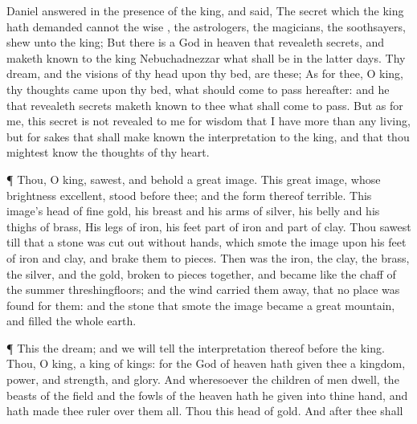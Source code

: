 {Daniel
answered in the
presence of the
king, and
said, The
secret which the
king hath
demanded
cannot the
wise
{}, the
astrologers, the
magicians, the
soothsayers,
shew unto the
king;
But there
is a
God in
heaven that
revealeth
secrets, and maketh
known to the
king
Nebuchadnezzar
what shall
be in the
latter
days. Thy
dream, and the
visions of thy
head
upon thy
bed, are
these;
As for
thee, O
king, thy
thoughts
came
{}
upon thy
bed,
what should come to
pass
hereafter: and he that
revealeth
secrets maketh
known to thee
what shall come to
pass.
But as for
me,
this
secret is
not
revealed to me for
{}
wisdom that I
have more
than
any
living,
but for
{}
sakes
that shall make
known the
interpretation to the
king, and that thou mightest
know the
thoughts of thy
heart.
\par }{\PP {}¶
Thou, O
king,
sawest, and
behold a
great
image.
This
great
image, whose
brightness
{}
excellent,
stood
before thee; and the
form thereof
{}
terrible.
This
image’s
head
{} of
fine
gold, his
breast and his
arms of
silver, his
belly and his
thighs of
brass,
His
legs of
iron, his
feet
part of
iron and
part of
clay.
Thou
sawest
till that a
stone was cut
out
without
hands, which
smote the
image
upon his
feet
{} of
iron and
clay, and
brake
them to
pieces.
Then was the
iron, the
clay, the
brass, the
silver, and the
gold, broken to
pieces
together, and
became like the
chaff
of the
summer
threshingfloors; and the
wind
carried
them
away,
that
no
place was
found for them: and the
stone that
smote the
image
became a
great
mountain, and
filled the
whole
earth.
\par }{\PP {}¶
This
{} the
dream; and we will
tell the
interpretation thereof
before the
king.
Thou, O
king,
{} a
king of
kings: for the
God of
heaven hath
given thee a
kingdom,
power, and
strength, and
glory.
And
wheresoever the
children of
men
dwell, the
beasts of the
field and the
fowls of the
heaven hath he
given into thine
hand, and hath made thee
ruler over them
all.
Thou
{} this
head of
gold.
And
after thee shall
}
